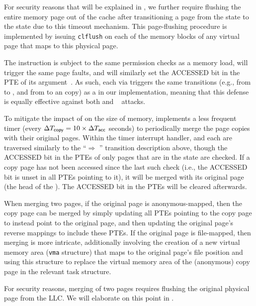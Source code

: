 For security reasons that will be explained in
, we further require flushing the entire
memory page out of the cache after transitioning a page from the
\accessed state to the \shared state due to this timeout
mechanism. This page-flushing procedure is implemented by issuing
\texttt{clflush} on each of the memory blocks of any virtual page that
maps to this physical page.

 The \clflush instruction is
subject to the same permission checks as a memory load, will trigger
the same page faults,
and will similarly set the ACCESSED bit in the \gls{PTE} of its
argument~\cite{guide2010intel}.  As such, each \Flush via \clflush
triggers the same transitions (e.g., from \shared to \accessed, and
from \accessed to an \exclusive copy) as a \Reload in our
implementation, meaning that this defense is equally effective against
both \flushreload and \flushflush~\cite{gruss:2015:FF} attacks.

  To mitigate the impact of \coa on the
size of memory, \cachebar implements a less frequent timer (every
$\Delta{T}_{\mathsf{copy}} = 10\times\Delta{T}_{\mathsf{acc}}$ seconds) to periodically
merge the page copies with their original pages. Within the timer
interrupt handler, \originalpagelist and each \copypagelist are
traversed similarly to the ``\accessed $\Rightarrow$ \shared''
transition description above, though the ACCESSED bit in the \gls{PTE}s of
only pages that are in the \exclusive state are checked. If a copy
page has not been accessed since the last such check (i.e., the
ACCESSED bit is unset in all \gls{PTE}s pointing to it), it will be merged
with its original page (the head of the \copypagelist). The ACCESSED
bit in the \gls{PTE}s will be cleared afterwards.

When merging two pages, if the original page is anonymous-mapped, then
the copy page can be merged by simply updating all \gls{PTE}s pointing to
the copy page to instead point to the original page, and then updating
the original page's reverse mappings to include these \gls{PTE}s.  If the
original page is file-mapped, then merging is more
intricate, additionally involving the creation of a new virtual memory
area (\texttt{vma} structure) that maps to the original page's file
position and using this structure to replace the virtual memory area
of the (anonymous) copy page in the relevant task structure.

For security reasons, merging of two pages requires flushing the
original physical page from the \gls{LLC}.  We will elaborate on this point
in .

